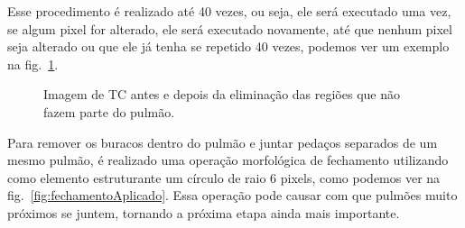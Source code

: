 Esse procedimento é realizado até 40 vezes, ou seja, ele será executado uma vez, se algum pixel for alterado, ele será executado novamente, até que nenhum pixel seja alterado ou que ele já tenha se repetido 40 vezes, podemos ver um exemplo na fig.~\ref{fig:clean}.

\begin{figure}[!ht]
 \begin{center}
 \end{center}
 \caption{Imagem de TC antes e depois da eliminação das regiões que não fazem parte do pulmão.}
 \label{fig:clean}
\end{figure}

Para remover os buracos dentro do pulmão e juntar pedaços separados de um mesmo pulmão, é realizado uma operação morfológica de fechamento utilizando como elemento estruturante um círculo de raio 6 pixels, como podemos ver na fig.~\ref{fig:fechamentoAplicado}. Essa operação pode causar com que pulmões muito próximos se juntem, tornando a próxima etapa ainda mais importante.

